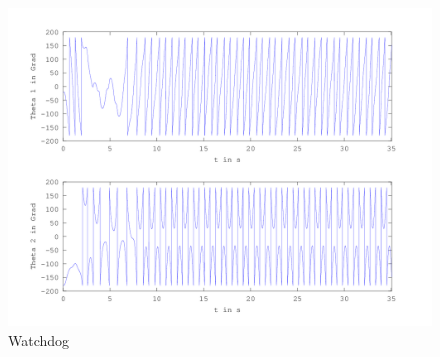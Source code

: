 \begin{figure}[htbp]
	\centering
	\includegraphics[width=1.\textwidth]{Grafiken/Watchdog_lang.png}
	\caption{Watchdog}
	\label{fig.Watchdog-Plot}
\end{figure}


